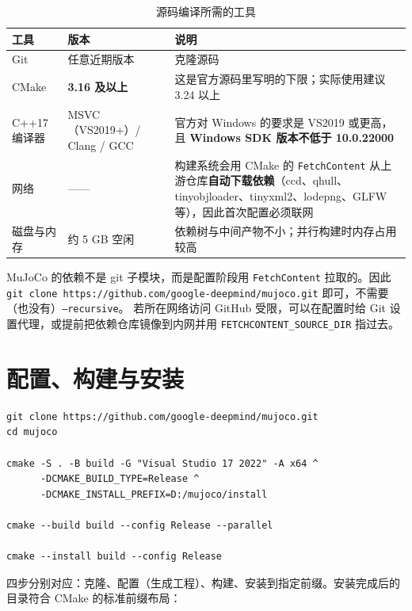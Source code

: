 \begin{table}[H]
	\centering
	\caption{源码编译所需的工具}
	\label{tab:Build:工具}
	\footnotesize
	\begin{tabular}{>{\raggedright\arraybackslash}p{3.4cm}>{\raggedright\arraybackslash}p{4.0cm}>{\raggedright\arraybackslash}p{6.8cm}}
		\hline
		工具 & 版本 & 说明 \\
		\hline
		Git & 任意近期版本 & 克隆源码 \\
		CMake & \textbf{3.16 及以上} & 这是官方源码里写明的下限；实际使用建议 3.24 以上 \\
		C++17 编译器 & MSVC（VS2019+）/ Clang / GCC & 官方对 Windows 的要求是 VS2019 或更高，且 \textbf{Windows SDK 版本不低于 10.0.22000} \\
		网络 & —— & 构建系统会用 CMake 的 \texttt{FetchContent} 从上游仓库\textbf{自动下载依赖}（ccd、qhull、tinyobjloader、tinyxml2、lodepng、GLFW 等），因此首次配置必须联网 \\
		磁盘与内存 & 约 5 GB 空闲 & 依赖树与中间产物不小；并行构建时内存占用较高 \\
		\hline
	\end{tabular}
\end{table}

\begin{tipbox}
	MuJoCo 的依赖不是 git 子模块，而是配置阶段用 \texttt{FetchContent} 拉取的。因此
	\texttt{git clone https://github.com/google-deepmind/mujoco.git} 即可，不需要（也没有）\texttt{--recursive}。
	若所在网络访问 GitHub 受限，可以在配置时给 Git 设置代理，或提前把依赖仓库镜像到内网并用 \texttt{FETCHCONTENT\_SOURCE\_DIR} 指过去。
\end{tipbox}

\section{配置、构建与安装}

\begin{lstlisting}[style=shell]
git clone https://github.com/google-deepmind/mujoco.git
cd mujoco

cmake -S . -B build -G "Visual Studio 17 2022" -A x64 ^
      -DCMAKE_BUILD_TYPE=Release ^
      -DCMAKE_INSTALL_PREFIX=D:/mujoco/install

cmake --build build --config Release --parallel

cmake --install build --config Release
\end{lstlisting}

四步分别对应：克隆、配置（生成工程）、构建、安装到指定前缀。安装完成后的目录符合 CMake 的标准前缀布局：

